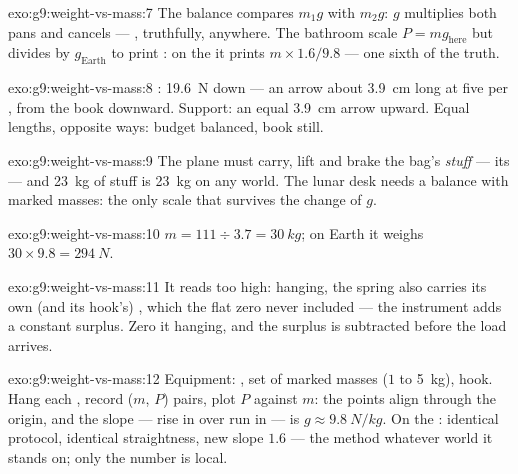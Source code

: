 \begin{solution}{exo:g9:weight-vs-mass:7}
The balance compares $m_1 g$ with $m_2 g$: $g$ multiplies both
pans and cancels --- , truthfully, anywhere. The bathroom
scale  $P = m g_{\text{here}}$ but divides by
$g_{\text{Earth}}$ to print : on the  it prints
$m \times 1.6/9.8$ --- one sixth of the truth.
\end{solution}

\begin{solution}{exo:g9:weight-vs-mass:8}
: \qty{19.6}{N} down --- an arrow about \qty{3.9}{cm}
long at five  per , from the book downward.
Support: an equal \qty{3.9}{cm} arrow upward. Equal lengths,
opposite ways: budget balanced, book still.
\end{solution}

\begin{solution}{exo:g9:weight-vs-mass:9}
The plane must carry, lift and brake the bag's \emph{stuff} ---
its  --- and \qty{23}{kg} of stuff is \qty{23}{kg} on any
world. The lunar desk needs a balance with marked masses: the
only scale that survives the change of $g$.
\end{solution}

\begin{solution}{exo:g9:weight-vs-mass:10}
$m = 111 \div 3.7 = \qty{30}{kg}$; on Earth it weighs $30
\times 9.8 = \qty{294}{N}$.
\end{solution}

\begin{solution}{exo:g9:weight-vs-mass:11}
It reads too high: hanging, the spring also carries its own
(and its hook's) , which the flat zero never included
--- the instrument adds a constant surplus. Zero it hanging,
and the surplus is subtracted before the load arrives.
\end{solution}

\begin{solution}{exo:g9:weight-vs-mass:12}
Equipment: , set of marked masses ($1$ to
\qty{5}{kg}), hook. Hang each , record ($m$, $P$) pairs,
plot $P$ against $m$: the points align through the origin, and
the slope --- rise in  over run in  --- is
$g \approx \qty{9.8}{N/kg}$. On the : identical protocol,
identical straightness, new slope $1.6$ --- the method
 whatever world it stands on; only the number is
local.
\end{solution}

